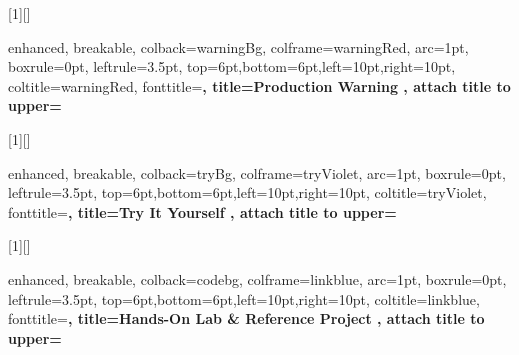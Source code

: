 [1][]{
  enhanced,
  breakable,
  colback=warningBg,
  colframe=warningRed,
  arc=1pt,
  boxrule=0pt,
  leftrule=3.5pt,
  top=6pt,bottom=6pt,left=10pt,right=10pt,
  coltitle=warningRed,
  fonttitle=\sffamily\bfseries\small,
  title={Production Warning },
  attach title to upper=\par\vspace{4pt}
}

[1][]{
  enhanced,
  breakable,
  colback=tryBg,
  colframe=tryViolet,
  arc=1pt,
  boxrule=0pt,
  leftrule=3.5pt,
  top=6pt,bottom=6pt,left=10pt,right=10pt,
  coltitle=tryViolet,
  fonttitle=\sffamily\bfseries\small,
  title={Try It Yourself },
  attach title to upper=\par\vspace{4pt}
}


[1][]{
  enhanced,
  breakable,
  colback=codebg,
  colframe=linkblue,
  arc=1pt,
  boxrule=0pt,
  leftrule=3.5pt,
  top=6pt,bottom=6pt,left=10pt,right=10pt,
  coltitle=linkblue,
  fonttitle=\sffamily\bfseries\small,
  title={Hands-On Lab \& Reference Project },
  attach title to upper=\par\vspace{4pt}
}

\usepackage[
  colorlinks=true,
  linkcolor=headingblue,
  citecolor=linkblue,
  urlcolor=linkblue,
  bookmarksnumbered=true,
  pdfstartview=FitH
]{hyperref}
